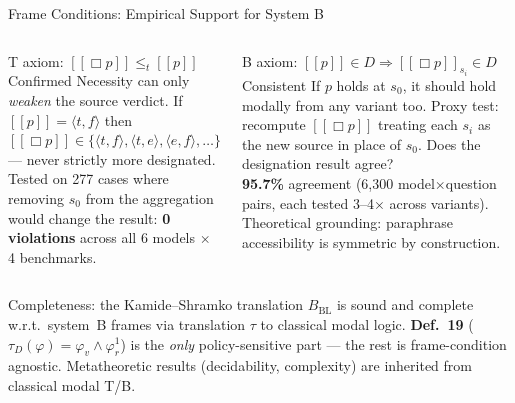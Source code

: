 \documentclass[aspectratio=169,9pt]{beamer}
\newcommand{\semp}{[\![p]\!]}
\newcommand{\BBL}{{B_{\mathrm{BL}}}}
\begin{document}
\begin{frame}{Frame Conditions: Empirical Support for System B}

  \begin{columns}[T]
    \begin{block}{T axiom: $[\![\Box p]\!] \leq_t \semp$ \hfill \textcolor{green!60!black}{Confirmed}}
      \small
      Necessity can only \emph{weaken} the source verdict.
      If $[\![p]\!] = \langle t,f\rangle$ then $[\![\Box p]\!] \in
      \{\langle t,f\rangle, \langle t,e\rangle, \langle e,f\rangle, \ldots\}$
      — never strictly more designated.\\[4pt]
      Tested on 277 cases where removing $s_0$ from the
      aggregation would change the result:
      \textbf{0 violations} across all 6 models $\times$ 4 benchmarks.
    \end{block}

    \begin{block}{B axiom: $\semp \in D \Rightarrow [\![\Box p]\!]_{s_i} \in D$ \hfill \textcolor{orange!80!black}{Consistent}}
      \small
      If $p$ holds at $s_0$, it should hold modally from any variant too.
      Proxy test: recompute $[\![\Box p]\!]$ treating each $s_i$ as the new
      source in place of $s_0$. Does the designation result agree?\\[4pt]
      \textbf{95.7\%} agreement (6{,}300 model$\times$question pairs,
      each tested 3--4$\times$ across variants).\\[4pt]
      Theoretical grounding: paraphrase accessibility is symmetric
      by construction.
    \end{block}
  \end{columns}

  \medskip\pause

  \begin{block}{Completeness: the Kamide--Shramko translation}
    \small $\BBL$ is sound and complete w.r.t.\ system~B frames via translation
    $\tau$ to classical modal logic.
    \textbf{Def.~19} ($\tau_D(\varphi) = \varphi_v \wedge \varphi^1_r$) is the
    \emph{only} policy-sensitive part — the rest is frame-condition agnostic.
    Metatheoretic results (decidability, complexity)
    are inherited from classical modal T/B.
  \end{block}

\end{frame}
\end{document}

